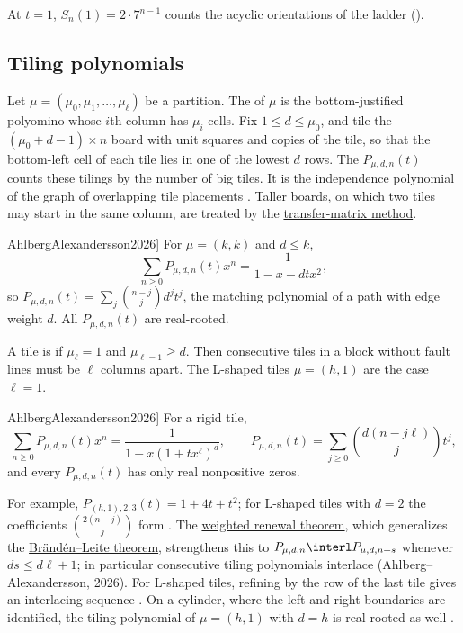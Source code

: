 At $t=1$, $S_n(1)=2\cdot7^{n-1}$ counts the acyclic orientations of the
ladder ().


\subsection[realRootedTilingPolynomials]{Tiling polynomials}

Let $\mu=(\mu_0,\mu_1,\dotsc,\mu_\ell)$ be a partition.  The  of $\mu$ is the bottom-justified polyomino whose $i$th column has
$\mu_i$ cells.  Fix $1\leq d\leq\mu_0$, and tile the
$(\mu_0+d-1)\times n$ board with unit squares and copies of the tile, so that
the bottom-left cell of each tile lies in one of the lowest $d$ rows.  The
\label{tilingPolynomial} $P_{\mu,d,n}(t)$ counts
these tilings by the number of big tiles.  It is the independence
polynomial of the graph of overlapping tile placements
\cite[Lemma~4]{AhlbergAlexandersson2026}.  Taller boards, on which two tiles
may start in the same column, are treated by the
\hyperref[transferMatrixWeightedTilings]{transfer-matrix method}.

\begin{theorem}[Ahlberg--Alexandersson, \cite[Thm.~6]{AhlbergAlexandersson2026}]
For $\mu=(k,k)$ and $d\leq k$,
\[
 \sum_{n\geq0}P_{\mu,d,n}(t)x^n=\frac{1}{1-x-dtx^2},
\]
so $P_{\mu,d,n}(t)=\sum_j\binom{n-j}{j}d^jt^j$, the matching polynomial of
a path with edge weight $d$.  All $P_{\mu,d,n}(t)$ are real-rooted.
\end{theorem}

A tile is \label{rigidTilingPolynomials} if $\mu_\ell=1$ and
$\mu_{\ell-1}\geq d$.  Then consecutive tiles in a block without fault lines
must be $\ell$ columns apart.  The L-shaped tiles $\mu=(h,1)$ are the case
$\ell=1$.

\begin{theorem}[Ahlberg--Alexandersson, \cite[Prop.~2 and Thm.~14]{AhlbergAlexandersson2026}]
For a rigid tile,
\[
 \sum_{n\geq0}P_{\mu,d,n}(t)x^n=\frac{1}{1-x(1+tx^\ell)^d},
 \qquad
 P_{\mu,d,n}(t)=\sum_{j\geq0}\binom{d(n-j\ell)}{j}t^j,
\]
and every $P_{\mu,d,n}(t)$ has only real nonpositive zeros.
\end{theorem}

For example, $P_{(h,1),2,3}(t)=1+4t+t^2$; for L-shaped tiles with $d=2$
the coefficients $\binom{2(n-j)}{j}$ form .  The
\hyperref[interlacingRenewalTheorem]{weighted renewal theorem}, which
generalizes the \hyperref[brandenLeiteRenewal]{Brändén--Leite theorem},
strengthens this to $P_{\mu,d,n}\interl P_{\mu,d,n+s}$ whenever
$ds\leq d\ell+1$; in particular consecutive tiling polynomials interlace
(Ahlberg--Alexandersson, 2026).  For L-shaped tiles, refining by the row of
the last tile gives an interlacing sequence
\cite[Thm.~5]{AhlbergAlexandersson2026}.  On a cylinder, where the left and
right boundaries are identified, the tiling polynomial of $\mu=(h,1)$ with
$d=h$ is real-rooted as well \cite[Thm.~21]{AhlbergAlexandersson2026}.


